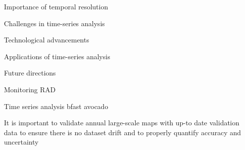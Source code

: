         Importance of temporal resolution

        Challenges in time-series analysis

        Technological advancements

        Applications of time-series analysis

        Future directions

        Monitoring RAD
    
        Time series analysis bfast avocado
    
        \citep{masolele2024mapping}
    
        It is important to validate annual large-scale maps with up-to date validation data to ensure there is no dataset drift and to properly quantify accuracy and uncertainty \citep{tsendbazar2021towards}
    

        
        

      
    
    
    

    
        
    
    
%         

%         


        
%         
    
    
            
                
            



        

